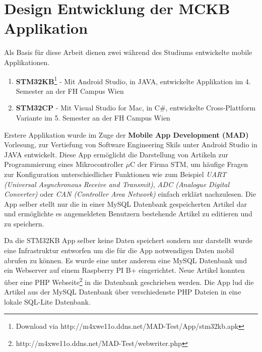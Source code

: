 %
%
% 
% 


\chapter{Design Entwicklung der MCKB Applikation}
\label{chap:xamarinformsdevelopment}

	Als Basis für diese Arbeit dienen zwei während des Studiums entwickelte mobile Applikationen.
	\begin{enumerate}
		\setlength\itemsep{0em}
		\item \textbf{STM32KB}\footnote{Download via http://m4xwe11o.ddns.net/MAD-Test/App/stm32kb.apk} - Mit Android Studio, in JAVA, entwickelte Applikation im 4. Semester an der FH Campus Wien
		\item \textbf{STM32CP} - Mit Visual Studio for Mac, in C\#, entwickelte Cross-Plattform Variante im 5. Semester an der FH Campus Wien
	\end{enumerate}
	Erstere Applikation wurde im Zuge der \textbf{Mobile App Development (MAD)} Vorlesung, zur Vertiefung von Software Engineering Skils unter Android Studio in JAVA entwickelt. Diese App ermöglicht die Darstellung von Artikeln zur Programmierung eines Mikrocontroller $\mu$C der Firma STM, um häufige Fragen zur Konfiguration unterschiedlicher Funktionen wie zum Beispiel \textit{UART (Universal Asynchronous Receive and Transmit)}, \textit{ADC (Analogue Digital Converter)} oder \textit{CAN (Controller Area Network)} einfach erklärt nachzulesen. Die App selber stellt nur die in einer MySQL Datenbank gespeicherten Artikel dar und ermöglichte es angemeldeten Benutzern bestehende Artikel zu editieren und zu speichern.

	Da die STM32KB App selber keine Daten speichert sondern nur darstellt wurde eine Infrastruktur entworfen um die für die App notwendigen Daten mobil abrufen zu können. Es wurde eine unter anderem eine MySQL Datenbank und ein Webserver auf einem Raspberry PI B+ eingerichtet. Neue Artikel konnten über eine PHP Webseite\footnote{http://m4xwe11o.ddns.net/MAD-Test/webwriter.php} in die Datenbank geschrieben werden. Die App lud die Artikel aus der MySQL Datenbank über verschiedenste PHP Dateien in eine lokale SQL-Lite Datenbank.

